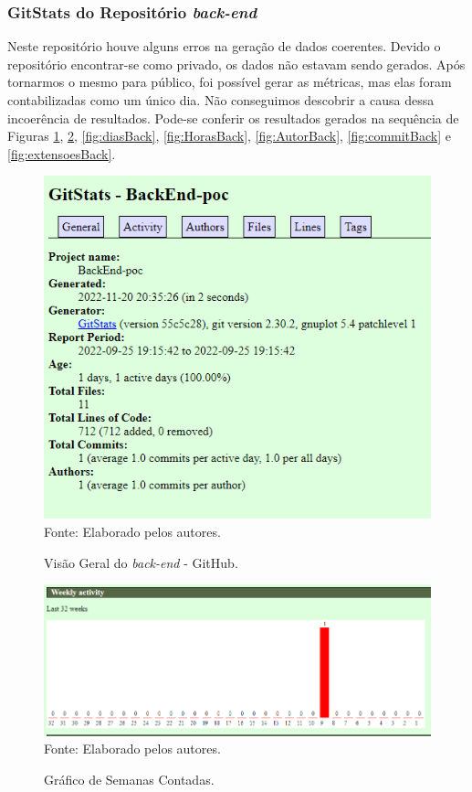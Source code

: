\documentclass[
    12pt,               %
    openright,          %
    oneside,
    a4paper,            %
    BIBLATEX,           %
    TODO,               %
    english,            %
    brazil              %
    ]{ifsp-spo-inf-ctds}
\begin{document}
        \subsubsection{GitStats do Repositório \emph{back-end}}

        Neste repositório houve alguns erros na geração de dados coerentes. Devido o repositório encontrar-se como privado, os dados não estavam sendo gerados. Após tornarmos o mesmo para público, foi possível gerar as métricas, mas elas foram contabilizadas como um único dia. Não conseguimos descobrir a causa dessa incoerência de resultados. 
        Pode-se conferir os resultados gerados na sequência de Figuras \ref{fig:geralBack}, \ref{fig:semanasBack}, \ref{fig:diasBack}, \ref{fig:HorasBack}, \ref{fig:AutorBack}, \ref{fig:commitBack} e \ref{fig:extensoesBack}.

            \begin{figure}[H]
                \centering
                \caption{Visão Geral do \emph{back-end} - GitHub.}
                \includegraphics[width=1 \textwidth]{Gitstats/back-end/GeralBack.png}
                {\footnotesize Fonte: Elaborado pelos autores.}
                \label{fig:geralBack}
            \end{figure} 


            \begin{figure}[H]
                \centering
                \caption{Gráfico de Semanas Contadas.}
                \includegraphics[width=1 \textwidth]{Gitstats/back-end/SemanasBack.png}
                {\footnotesize Fonte: Elaborado pelos autores.}
                \label{fig:semanasBack}
            \end{figure}   
\end{document}
